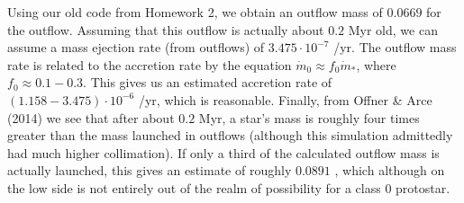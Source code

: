 \documentclass[11pt]{article}
\newenvironment{tight_enumerate}{
    \begin{enumerate}[label=(\alph*)]
    \setlength{\itemsep}{3pt}
    \setlength{\parskip}{0pt}}
    {\end{enumerate}}
\begin{document}
\begin{tight_enumerate}
\item Using our old code from Homework 2, we obtain an outflow mass of $0.0669$ \si{\msun} for the outflow. Assuming that this outflow is actually about $0.2$ \si{Myr} old, we can assume a mass ejection rate (from outflows) of $3.475\cdot10^{-7}$ \si{\msun/yr}. The outflow mass rate is related to the accretion rate by the equation $\dot{m}_{0} \approx f_{0}\dot{m}_{*}$, where $f_{0} \approx 0.1{-}0.3$. This gives us an estimated accretion rate of $(1.158{-}3.475)\cdot10^{-6}$ \si{\msun/yr}, which is reasonable. Finally, from Offner \& Arce (2014) we see that after about $0.2$ \si{Myr}, a star's mass is roughly four times greater than the mass launched in outflows (although this simulation admittedly had much higher collimation). If only a third of the calculated outflow mass is actually launched, this gives an estimate of roughly $0.0891$ \si{\msun}, which although on the low side is not entirely out of the realm of possibility for a class 0 protostar. 
\end{tight_enumerate}
\end{document}

